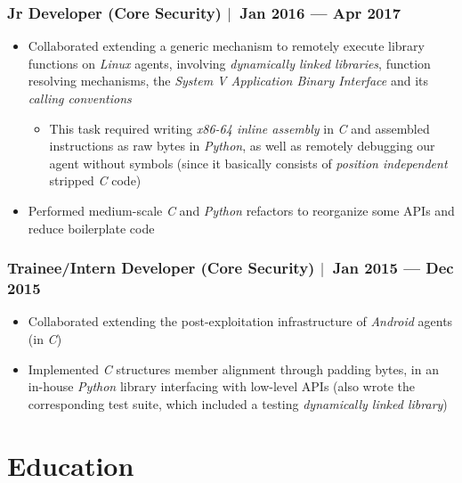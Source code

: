 \documentclass[12pt, a4paper]{article}
\newcommand{\mysep}{{\Large $\mid$}\ }
\newcommand{\timeFrame}[2]{{#1} --- {#2}}
\newcommand{\python}{\emph{Python}}
\newcommand{\cc}{\emph{C}}
\begin{document}
    \subsubsection*{Jr Developer (Core Security) \mysep \timeFrame{Jan 2016}{Apr 2017}}
    \begin{itemize}
        \item Collaborated extending a generic mechanism
        to remotely execute library functions on \emph{Linux} agents,
        involving \emph{dynamically linked libraries}, function resolving mechanisms,
        the \emph{System V Application Binary Interface} and its \emph{calling conventions}
        \begin{itemize}
            \item This task required writing \emph{x86-64 inline assembly} in \cc{}
            and assembled instructions as raw bytes in \python{},
            as well as remotely debugging our agent without symbols
            (since it basically consists of \emph{position independent} stripped \cc{} code)
        \end{itemize}
        \item Performed medium-scale \cc{} and \python{} refactors to reorganize some APIs
        and reduce boilerplate code
    \end{itemize}

    \subsubsection*{Trainee/Intern Developer (Core Security) \mysep \timeFrame{Jan 2015}{Dec 2015}}
    \begin{itemize}
        \item Collaborated extending the post-exploitation infrastructure of \emph{Android} agents (in \cc{})
        \item Implemented \cc{} structures member alignment through padding bytes,
        in an in-house \python{} library interfacing with low-level APIs
        (also wrote the corresponding test suite, which included a testing \emph{dynamically linked library})
    \end{itemize}


    \section*{Education} \label{sec:education}
\end{document}
